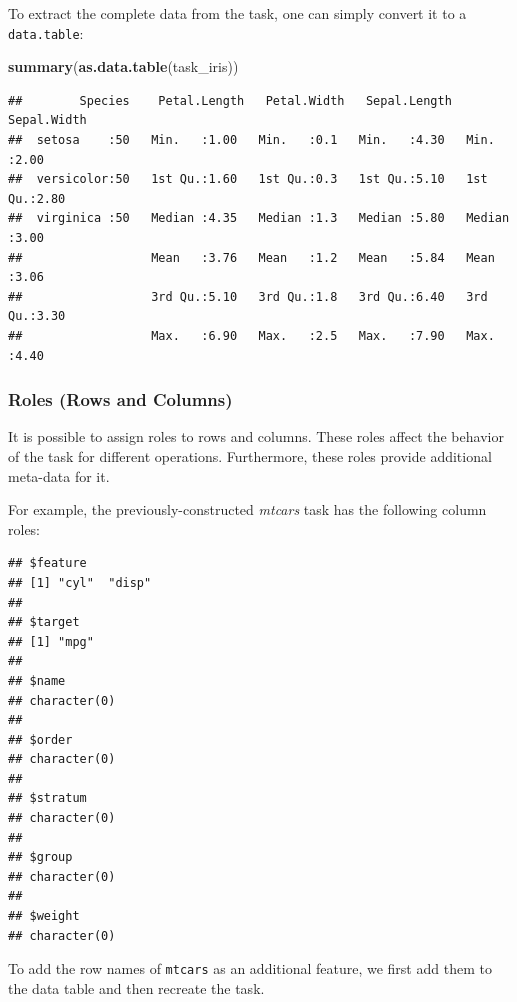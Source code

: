 \documentclass[]{scrbook}
\newenvironment{Shaded}{\begin{snugshade}}{\end{snugshade}}
\newcommand{\KeywordTok}[1]{\textcolor[rgb]{0.13,0.29,0.53}{\textbf{#1}}}
\newcommand{\NormalTok}[1]{#1}
\newcommand{\OperatorTok}[1]{\textcolor[rgb]{0.81,0.36,0.00}{\textbf{#1}}}
\renewenvironment{Shaded} {\begin{snugshade}\small} {\end{snugshade}}
\begin{document}
To extract the complete data from the task, one can simply convert it to a \texttt{data.table}:

\begin{Shaded}
\begin{Highlighting}[]
\KeywordTok{summary}\NormalTok{(}\KeywordTok{as.data.table}\NormalTok{(task_iris))}
\end{Highlighting}
\end{Shaded}

\begin{verbatim}
##        Species    Petal.Length   Petal.Width   Sepal.Length   Sepal.Width  
##  setosa    :50   Min.   :1.00   Min.   :0.1   Min.   :4.30   Min.   :2.00  
##  versicolor:50   1st Qu.:1.60   1st Qu.:0.3   1st Qu.:5.10   1st Qu.:2.80  
##  virginica :50   Median :4.35   Median :1.3   Median :5.80   Median :3.00  
##                  Mean   :3.76   Mean   :1.2   Mean   :5.84   Mean   :3.06  
##                  3rd Qu.:5.10   3rd Qu.:1.8   3rd Qu.:6.40   3rd Qu.:3.30  
##                  Max.   :6.90   Max.   :2.5   Max.   :7.90   Max.   :4.40
\end{verbatim}

\hypertarget{tasks-roles}{%
\subsubsection{Roles (Rows and Columns)}\label{tasks-roles}}

It is possible to assign roles to rows and columns.
These roles affect the behavior of the task for different operations.
Furthermore, these roles provide additional meta-data for it.

For example, the previously-constructed \emph{mtcars} task has the following column roles:

\begin{Shaded}
\end{Shaded}

\begin{verbatim}
## $feature
## [1] "cyl"  "disp"
## 
## $target
## [1] "mpg"
## 
## $name
## character(0)
## 
## $order
## character(0)
## 
## $stratum
## character(0)
## 
## $group
## character(0)
## 
## $weight
## character(0)
\end{verbatim}

To add the row names of \texttt{mtcars} as an additional feature, we first add them to the data table and then recreate the task.
\end{document}
